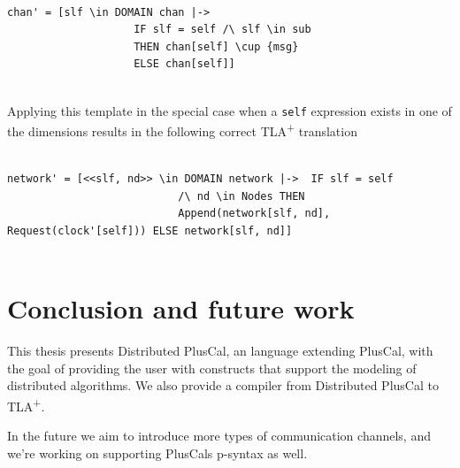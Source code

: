 \documentclass{thesul}
\newcommand{\tlaplus}{TLA\textsuperscript{+}\xspace}
\begin{document}
\begin{lstlisting}[frame=none, numbers=none]

chan' = [slf \in DOMAIN chan |-> 
					IF slf = self /\ slf \in sub
					THEN chan[self] \cup {msg}
					ELSE chan[self]]
					
\end{lstlisting}

Applying this template in the special case when a \verb|self| expression exists in one of the dimensions results in the following correct \tlaplus translation

\begin{lstlisting}[frame=none, numbers=none]

network' = [<<slf, nd>> \in DOMAIN network |->  IF slf = self 
                           /\ nd \in Nodes THEN 
                           Append(network[slf, nd], Request(clock'[self])) ELSE network[slf, nd]]
					
\end{lstlisting}


\label{chanexpand}
\chapter{Conclusion and future work}

This thesis presents Distributed PlusCal, an language extending PlusCal, with the goal of providing the user with constructs that support the modeling of distributed algorithms. We also provide a compiler from Distributed PlusCal to \tlaplus.

In the future we aim to introduce more types of communication channels, and we're working on supporting PlusCals p-syntax as well.
\end{document}
